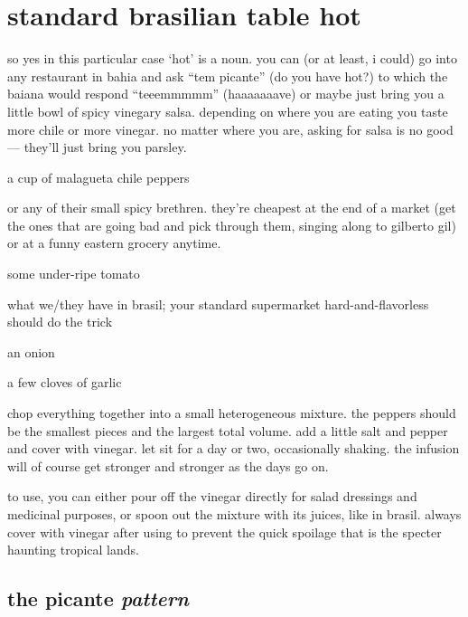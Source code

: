 \section{standard brasilian table hot}

so yes in this particular case `hot' is a noun. you can (or at least,
i could) go into any restaurant in bahia and ask ``tem picante'' (do
you have hot?) to which the baiana would respond ``teeemmmmm''
(haaaaaaave) or maybe just bring you a little bowl of spicy vinegary
salsa. depending on where you are eating you taste more chile or more
vinegar. no matter where you are, asking for salsa is no good ---
they'll just bring you parsley.

\begin{ingredients}
  \item a cup of malagueta chile peppers
\end{ingredients}

or any of their small spicy brethren. they're cheapest at the end of a
market (get the ones that are going bad and pick through them, singing
along to gilberto gil) or at a funny eastern grocery anytime.

\begin{ingredients}
  \item some under-ripe tomato
\end{ingredients}

what we/they have in brasil; your standard supermarket
hard-and-flavorless should do the trick

\begin{ingredients}
  \item an onion
  \item a few cloves of garlic
\end{ingredients}

chop everything together into a small heterogeneous mixture. the
peppers should be the smallest pieces and the largest total
volume. add a little salt and pepper and cover with vinegar. let sit
for a day or two, occasionally shaking. the infusion will of course
get stronger and stronger as the days go on.

to use, you can either pour off the vinegar directly for salad
dressings and medicinal purposes, or spoon out the mixture with its
juices, like in brasil. always cover with vinegar after using to
prevent the quick spoilage that is the specter haunting tropical
lands.

\subsection{the picante \textit{pattern}}

